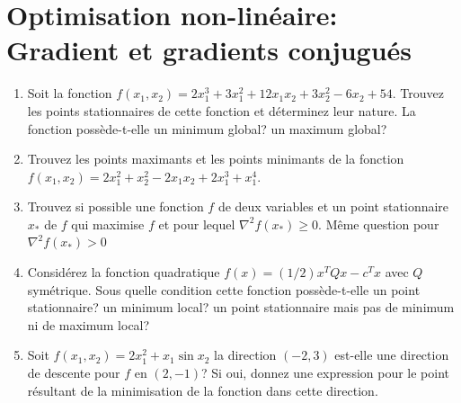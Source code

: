 


\section{Optimisation non-linéaire: Gradient et gradients conjugués}



\begin{enumerate}

    \begin{solution}
    \end{solution}

  \item Soit la fonction $f(x_1, x_2)= 2 x_1^3+3 x_1^2+12x_1 x_2 + 3 x_2^2
    -6 x_2 + 54$. Trouvez les points stationnaires de cette fonction et déterminez leur nature.
    La fonction possède-t-elle un minimum global? un maximum global?

    \begin{solution}
    \end{solution}

  \item Trouvez les points maximants et les points minimants de la fonction $f(x_1, x_2)=2x_1^2+x_2^2-2x_1x_2+2x_1^3+x_1^4$.

    \begin{solution}
    \end{solution}

  \item Trouvez si possible une fonction $f$ de deux variables et un point stationnaire $x_*$ de $f$ qui maximise $f$ et pour lequel
    $\nabla^2 f(x_*)
    \geq 0$. Même question pour  $\nabla^2 f(x_*)> 0$

    \begin{solution}
    \end{solution}

  \item Considérez la fonction quadratique $f(x)=(1/2) x^T Q x-c^T x$ avec $Q$ symétrique. Sous quelle condition cette fonction possède-t-elle un
    point stationnaire? un minimum local? un point stationnaire mais pas de minimum ni de maximum local?

    \begin{solution}
    \end{solution}

  \item Soit $f(x_1, x_2)=2x_1^2+x_1 \sin x_2$ la direction $(-2, 3)$ est-elle une direction de descente pour $f$ en $(2, -1)$? Si oui, donnez
    une expression pour le point résultant de la minimisation de la fonction dans cette direction.



\end{enumerate}
